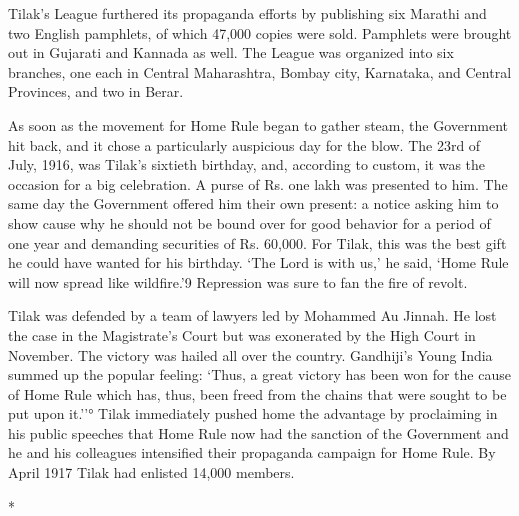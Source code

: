 Tilak's League furthered its propaganda efforts by publishing six Marathi and two English pamphlets, of which 47,000 copies were sold. Pamphlets were brought out in Gujarati and Kannada as well. The League was organized into six branches, one each in Central Maharashtra, Bombay city, Karnataka, and Central Provinces, and two in Berar.

As soon as the movement for Home Rule began to gather steam, the Government hit back, and it chose a particularly auspicious day for the blow. The 23rd of July, 1916, was Tilak's sixtieth birthday, and, according to custom, it was the occasion for a big celebration. A purse of Rs. one lakh was presented to him. The same day the Government offered him their own present: a notice asking him to show cause why he should not be bound over for good behavior for a period of one year and demanding securities of Rs. 60,000. For Tilak, this was the best gift he could have wanted for his birthday. `The Lord is with us,' he said, `Home Rule will now spread like wildfire.'9 Repression was sure to fan the fire of revolt.

Tilak was defended by a team of lawyers led by Mohammed Au Jinnah. He lost the case in the Magistrate's Court but was exonerated by the High Court in November. The victory was hailed all over the country. Gandhiji's Young India summed up the popular feeling: `Thus, a great victory has been won for the cause of Home Rule which has, thus, been freed from the chains that were sought to be put upon it.''° Tilak immediately pushed home the advantage by proclaiming in his public speeches that Home Rule now had the sanction of the Government and he and his colleagues intensified their propaganda campaign for Home Rule. By April 1917 Tilak had enlisted 14,000 members.

\begin{center}*\end{center}

\paragraph*{}

